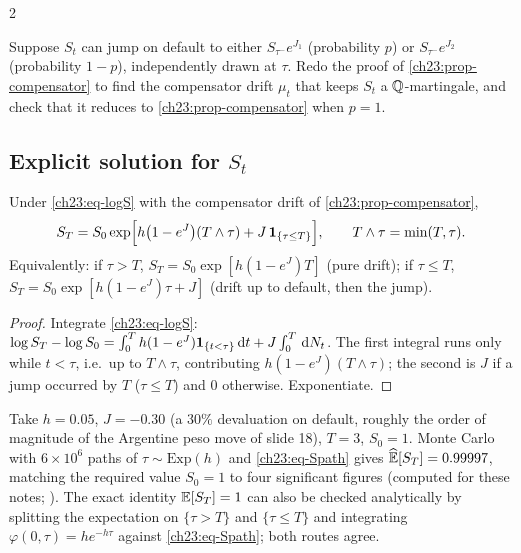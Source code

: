 \begin{paracol}{2}
\begin{exercise}\label{ch23:ex-twojumps}
Suppose $S_t$ can jump on default to either $S_{\tau^-}e^{J_1}$ (probability $p$) or $S_{\tau^-}e^{J_2}$
(probability $1-p$), independently drawn at $\tau$. Redo the proof of \cref{ch23:prop-compensator} to find the
compensator drift $\mu_t$ that keeps $S_t$ a $\mathbb{Q}$-martingale, and check that it reduces to
\cref{ch23:prop-compensator} when $p=1$.
\end{exercise}

\subsection{Explicit solution for \texorpdfstring{$S_t$}{S\_t}}\label{ch23:sec-explicit}
\begin{proposition}\label{ch23:prop-Spath}
Under \cref{ch23:eq-logS} with the compensator drift of \cref{ch23:prop-compensator},
\begin{equation}\label{ch23:eq-Spath}
  S_T=S_0\exp\Bigl[h\bigl(1-e^J\bigr)(T\wedge\tau)+J\,\mathbf{1}_{\{\tau\le T\}}\Bigr],
  \qquad T\wedge\tau=\min(T,\tau).
\end{equation}
Equivalently: if $\tau>T$, $S_T=S_0\exp[h(1-e^J)T]$ (pure drift); if $\tau\le T$, $S_T=S_0\exp[h(1-e^J)\tau+J]$
(drift up to default, then the jump).
\end{proposition}
\begin{proof}
Integrate \cref{ch23:eq-logS}: $\log S_T-\log S_0=\int_0^Th(1-e^J)\mathbf{1}_{\{t<\tau\}}\,\mathrm{d} t+J\int_0^T\,\mathrm{d} N_t$. The first
integral runs only while $t<\tau$, i.e.\ up to $T\wedge\tau$, contributing $h(1-e^J)(T\wedge\tau)$; the second is
$J$ if a jump occurred by $T$ ($\tau\le T$) and $0$ otherwise. Exponentiate.
\end{proof}

\begin{example}\label{ch23:ex-mc}
Take $h=0.05$, $J=-0.30$ (a $30\%$ devaluation on default, roughly the order of magnitude of the Argentine peso
move of slide 18), $T=3$, $S_0=1$. Monte Carlo with $6\times10^6$ paths of $\tau\sim\mathrm{Exp}(h)$ and
\cref{ch23:eq-Spath} gives $\widehat{\mathbb{E}}[S_T]=0.99997$, matching the required value $S_0=1$ to four significant
figures (computed for these notes; ). The exact identity
$\mathbb{E}[S_T]=1$ can also be checked analytically by splitting the expectation on $\{\tau>T\}$ and $\{\tau\le T\}$ and
integrating $\varphi(0,\tau)=he^{-h\tau}$ against \cref{ch23:eq-Spath}; both routes agree.
\end{example}

\end{paracol}
